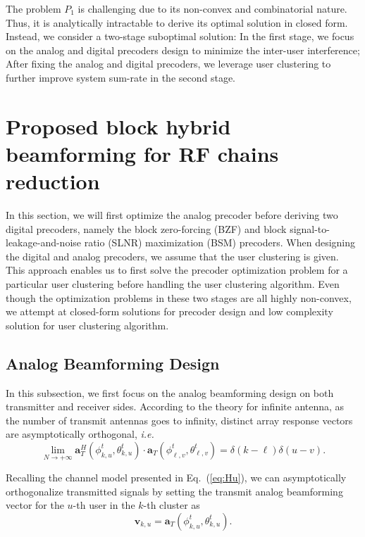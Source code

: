 \documentclass[conference]{IEEEtran}
\begin{document}
{The problem $P_1$ is challenging due to its non-convex and combinatorial nature. Thus, it is analytically intractable to derive its optimal solution in closed form. Instead, we consider a two-stage suboptimal solution: In the first stage, we focus on the analog  and digital precoders design to minimize the inter-user interference; After fixing the analog and digital precoders, we leverage user clustering to further improve system sum-rate in the second stage.

\section{Proposed block hybrid beamforming for RF chains reduction}
In this section, we will first optimize the analog precoder before deriving two digital precoders, namely the block zero-forcing (BZF) and block signal-to-leakage-and-noise ratio (SLNR) maximization (BSM) precoders. When designing the digital and analog precoders, we assume that the user clustering is given. This approach enables us to first solve the precoder optimization problem for a particular user clustering before handling the user clustering algorithm. Even though the optimization problems in these two stages are all highly non-convex, we attempt at closed-form solutions for precoder design and low complexity solution for user clustering algorithm.

\subsection{Analog Beamforming Design}\label{analog}
In this subsection, we first focus on the analog beamforming design on both transmitter and receiver sides. According to the theory for infinite antenna, as the number of transmit antennas goes to infinity, distinct array response vectors are asymptotically orthogonal, {\em i.e.}
\begin{equation}\label{Eq:assumption}
\lim_{N\rightarrow +\infty} \bm{a}_{T}^{H}(\phi^t_{k,u},\theta^t_{k,u}) \cdot\bm{a}_{T}(\phi^t_{\ell,v},\theta^t_{\ell,v})=\delta(k-\ell)\delta(u-v).
\end{equation}

Recalling the channel model presented in Eq.~(\ref{eq:Hu}), we can asymptotically orthogonalize transmitted signals by setting the transmit analog beamforming vector for the $u$-th user in the $k$-th cluster as
\begin{equation}
\bm{v}_{k,u}=\bm{a}_{T}(\phi^t_{k,u},\theta^t_{k,u}).
\label{eq:vku}
\end{equation}

}
\end{document}

